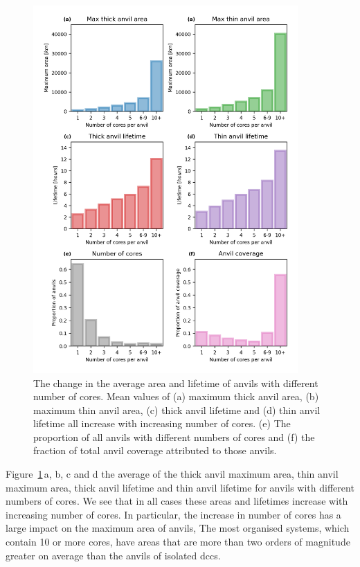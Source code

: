 \begin{figure}[tp]
    \centering
    \includegraphics[width=0.9\textwidth]{figures/chapter2_21.png}
    \caption[
    The change in the average area and lifetime of anvils with different number of cores, and their total area coverage.
    ]{
    The change in the average area and lifetime of anvils with different number of cores. Mean values of (a) maximum thick anvil area, (b) maximum thin anvil area, (c) thick anvil lifetime and (d) thin anvil lifetime all increase with increasing number of cores. (e) The proportion of all anvils with different numbers of cores and (f) the fraction of total anvil coverage attributed to those anvils.}
    \label{fig:anvil_cores_and_coverage}
\end{figure}

Figure~\ref{fig:anvil_cores_and_coverage}\,a, b, c and d the average of the thick anvil maximum area, thin anvil maximum area, thick anvil lifetime and thin anvil lifetime for anvils with different numbers of cores.
We see that in all cases these areas and lifetimes increase with increasing number of cores.
In particular, the increase in number of cores has a large impact on the maximum area of anvils, 
The most organised systems, which contain 10 or more cores, have areas that are more than two orders of magnitude greater on average than the anvils of isolated \acrshort{dcc}s.

